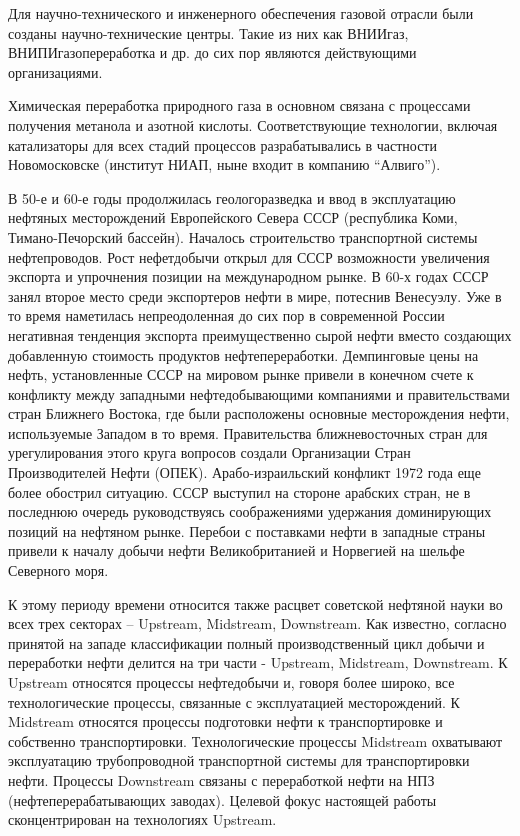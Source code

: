 Для научно-технического и инженерного обеспечения газовой отрасли были созданы научно-технические центры.
Такие из них как ВНИИгаз, ВНИПИгазопереработка и др. до сих пор являются действующими организациями.

Химическая переработка природного газа в основном связана с процессами получения метанола и азотной кислоты.
Соответствующие технологии, включая катализаторы для всех стадий процессов разрабатывались в частности Новомосковске (институт НИАП, ныне входит в компанию ``Алвиго'').

В 50-е и 60-е годы продолжилась геологоразведка и ввод в эксплуатацию нефтяных месторождений Европейского Севера СССР (республика Коми, Тимано-Печорский бассейн).
Началось строительство транспортной системы нефтепроводов.
Рост нефетдобычи открыл для СССР возможности увеличения экспорта и упрочнения позиции на международном рынке.
В 60-х годах СССР занял второе место среди экспортеров нефти в мире, потеснив Венесуэлу.
Уже в то время наметилась непреодоленная до сих пор в современной России негативная тенденция экспорта преимущественно сырой нефти вместо создающих добавленную стоимость продуктов нефтепереработки.
Демпинговые цены на нефть, установленные СССР на мировом рынке привели в конечном счете к конфликту между западными нефтедобывающими компаниями и правительствами стран Ближнего Востока, где были расположены основные месторождения нефти, используемые Западом в то время.
Правительства ближневосточных стран для урегулирования этого круга вопросов создали Организации Стран Производителей Нефти (ОПЕК).
Арабо-израильский конфликт 1972 года еще более обострил ситуацию.
СССР выступил на стороне арабских стран, не в последнюю очередь руководствуясь соображениями удержания доминирующих позиций на нефтяном рынке.
Перебои с поставками нефти в западные страны привели к началу добычи нефти Великобританией и Норвегией на шельфе Северного моря.

К этому периоду времени относится также расцвет советской нефтяной науки во всех трех секторах -- Upstream, Midstream, Downstream.
Как известно, согласно принятой на западе классификации полный производственный цикл добычи и переработки нефти делится на три части - Upstream, Midstream, Downstream.
К Upstream относятся процессы нефтедобычи и, говоря более широко, все технологические процессы, связанные с эксплуатацией месторождений.
К Midstream относятся процессы подготовки нефти к транспортировке и собственно транспортировки.
Технологические процессы Midstream охватывают эксплуатацию трубопроводной транспортной системы для транспортировки нефти.
Процессы Downstream связаны с переработкой нефти на НПЗ (нефтеперерабатывающих заводах).
Целевой фокус настоящей работы сконцентрирован на технологиях Upstream.

